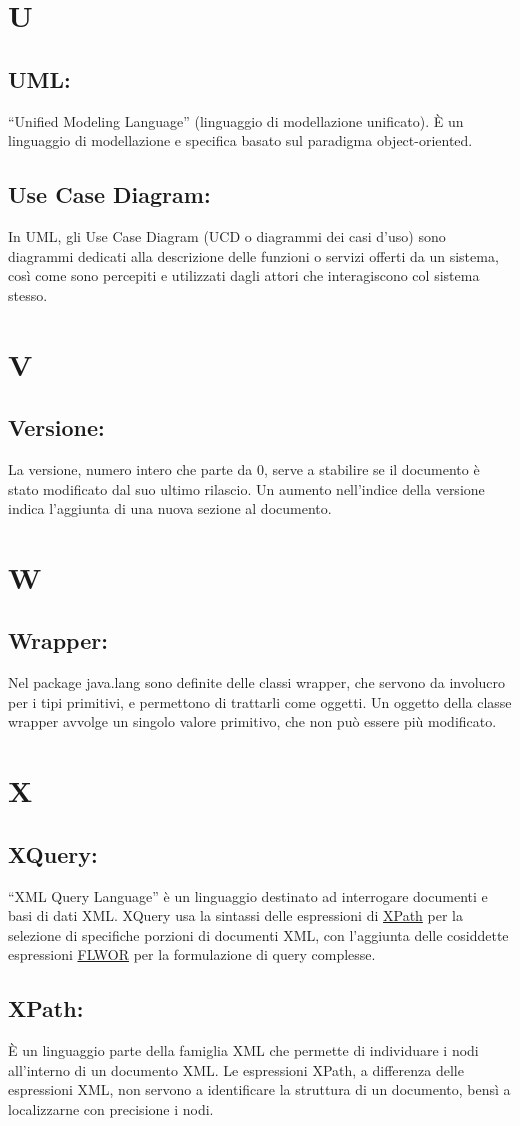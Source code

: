 \chapter{U}
\section{UML:}
``Unified Modeling Language'' (linguaggio di modellazione unificato). \`E un linguaggio di modellazione e specifica basato sul paradigma object-oriented.
\section{Use Case Diagram:}
In UML, gli Use Case Diagram (UCD o diagrammi dei casi d'uso) sono diagrammi dedicati alla descrizione delle funzioni o servizi offerti da un sistema, cos\`i come sono percepiti e utilizzati dagli attori che interagiscono col sistema stesso. 

\chapter{V}
\section{Versione:}
La versione, numero intero che parte da 0, serve a stabilire se il documento \`e stato modificato dal suo ultimo rilascio. Un aumento nell'indice della versione indica l'aggiunta di una nuova sezione al documento.

\chapter{W}
\hypertarget{wrapper}{}
\section{Wrapper:}
Nel package java.lang sono definite delle classi wrapper, che servono da involucro per i tipi primitivi, e permettono di trattarli come oggetti. Un oggetto della classe wrapper avvolge un singolo valore primitivo, che non pu\`o essere pi\`u modificato.

\chapter{X}
\hypertarget{XQuery}{}
\section{XQuery:}
``XML Query Language'' \`e un linguaggio destinato ad interrogare documenti e basi di dati XML.
XQuery usa la sintassi delle espressioni di \hyperlink{XPath}{XPath} per la selezione di specifiche porzioni di documenti XML, con l'aggiunta delle cosiddette espressioni \hyperlink{FLWOR}{FLWOR} per la formulazione di query complesse.
\hypertarget{XPath}{}
\section{XPath:}
\`E un linguaggio parte della famiglia XML che permette di individuare i nodi all'interno di un documento XML. Le espressioni XPath, a differenza delle espressioni XML, non servono a identificare la struttura di un documento, bens\`i a localizzarne con precisione i nodi.



